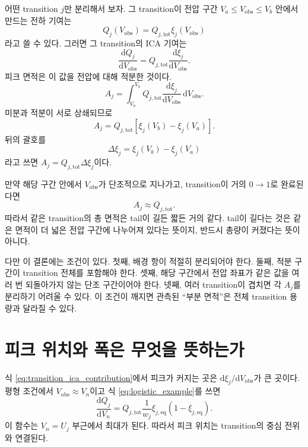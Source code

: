 \documentclass[11pt,a4paper]{article}
\newcommand{\dd}{\mathrm{d}}
\newcommand{\tot}{\mathrm{tot}}
\newcommand{\eqs}{\mathrm{eq}}
\newcommand{\obs}{\mathrm{obs}}
\begin{document}
어떤 transition \(j\)만 분리해서 보자. 그 transition이 전압 구간 \(V_a\le V_{\obs}\le V_b\) 안에서 만드는 전하 기여는
\begin{equation}
Q_j(V_{\obs})=Q_{j,\tot}\xi_j(V_{\obs})
\label{eq:transition_charge_vs_voltage}
\end{equation}
라고 쓸 수 있다. 그러면 그 transition의 ICA 기여는
\begin{equation}
\frac{\dd Q_j}{\dd V_{\obs}}
=
Q_{j,\tot}
\frac{\dd \xi_j}{\dd V_{\obs}}.
\label{eq:transition_ica_contribution}
\end{equation}
피크 면적은 이 값을 전압에 대해 적분한 것이다.
\begin{equation}
A_j
=
\int_{V_a}^{V_b}
Q_{j,\tot}
\frac{\dd \xi_j}{\dd V_{\obs}}
\,\dd V_{\obs}.
\label{eq:area_integral_start}
\end{equation}
미분과 적분이 서로 상쇄되므로
\begin{equation}
\boxed{
A_j
=
Q_{j,\tot}
\left[
\xi_j(V_b)-\xi_j(V_a)
\right].
}
\label{eq:area_integral_result}
\end{equation}
뒤의 괄호를
\begin{equation}
\Delta\xi_j=\xi_j(V_b)-\xi_j(V_a)
\label{eq:delta_xi_definition}
\end{equation}
라고 쓰면 \(A_j=Q_{j,\tot}\Delta\xi_j\)이다.

만약 해당 구간 안에서 \(V_{\obs}\)가 단조적으로 지나가고, transition이 거의 \(0\to 1\)로 완료된다면
\begin{equation}
A_j\approx Q_{j,\tot}.
\label{eq:area_complete_transition}
\end{equation}
따라서 같은 transition의 총 면적은 tail이 길든 짧든 거의 같다. tail이 길다는 것은 같은 면적이 더 넓은 전압 구간에 나누어져 있다는 뜻이지, 반드시 총량이 커졌다는 뜻이 아니다.

다만 이 결론에는 조건이 있다. 첫째, 배경 항이 적절히 분리되어야 한다. 둘째, 적분 구간이 transition 전체를 포함해야 한다. 셋째, 해당 구간에서 전압 좌표가 같은 값을 여러 번 되돌아가지 않는 단조 구간이어야 한다. 넷째, 여러 transition이 겹치면 각 \(A_j\)를 분리하기 어려울 수 있다. 이 조건이 깨지면 관측된 ``부분 면적''은 전체 transition 용량과 달라질 수 있다.

\section{피크 위치와 폭은 무엇을 뜻하는가}

식 \eqref{eq:transition_ica_contribution}에서 피크가 커지는 곳은 \(\dd \xi_j/\dd V_{\obs}\)가 큰 곳이다. 평형 조건에서 \(V_{\obs}\approx V_n\)이고 식 \eqref{eq:logistic_example}를 쓰면
\begin{equation}
\frac{\dd Q_j}{\dd V_n}
=
Q_{j,\tot}
\frac{1}{w_j}
\xi_{j,\eqs}(1-\xi_{j,\eqs}).
\label{eq:logistic_peak_contribution}
\end{equation}
이 함수는 \(V_n=U_j\) 부근에서 최대가 된다. 따라서 피크 위치는 transition의 중심 전위와 연결된다.
\end{document}
